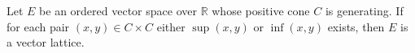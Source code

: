 Let $E$ be an ordered vector space over $\mathbb{R}$ whose positive cone $C$ is generating. If for each pair $(x, y) \in C \times C$ either $\sup(x, y)$ or $\inf(x, y)$ exists, then $E$ is a vector lattice.
